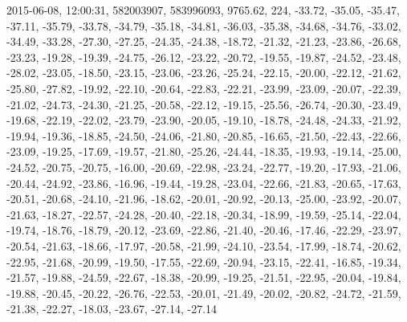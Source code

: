 2015-06-08, 12:00:31, 582003907, 583996093, 9765.62, 224, -33.72, -35.05, -35.47, -37.11, -35.79, -33.78, -34.79, -35.18, -34.81, -36.03, -35.38, -34.68, -34.76, -33.02, -34.49, -33.28, -27.30, -27.25, -24.35, -24.38, -18.72, -21.32, -21.23, -23.86, -26.68, -23.23, -19.28, -19.39, -24.75, -26.12, -23.22, -20.72, -19.55, -19.87, -24.52, -23.48, -28.02, -23.05, -18.50, -23.15, -23.06, -23.26, -25.24, -22.15, -20.00, -22.12, -21.62, -25.80, -27.82, -19.92, -22.10, -20.64, -22.83, -22.21, -23.99, -23.09, -20.07, -22.39, -21.02, -24.73, -24.30, -21.25, -20.58, -22.12, -19.15, -25.56, -26.74, -20.30, -23.49, -19.68, -22.19, -22.02, -23.79, -23.90, -20.05, -19.10, -18.78, -24.48, -24.33, -21.92, -19.94, -19.36, -18.85, -24.50, -24.06, -21.80, -20.85, -16.65, -21.50, -22.43, -22.66, -23.09, -19.25, -17.69, -19.57, -21.80, -25.26, -24.44, -18.35, -19.93, -19.14, -25.00, -24.52, -20.75, -20.75, -16.00, -20.69, -22.98, -23.24, -22.77, -19.20, -17.93, -21.06, -20.44, -24.92, -23.86, -16.96, -19.44, -19.28, -23.04, -22.66, -21.83, -20.65, -17.63, -20.51, -20.68, -24.10, -21.96, -18.62, -20.01, -20.92, -20.13, -25.00, -23.92, -20.07, -21.63, -18.27, -22.57, -24.28, -20.40, -22.18, -20.34, -18.99, -19.59, -25.14, -22.04, -19.74, -18.76, -18.79, -20.12, -23.69, -22.86, -21.40, -20.46, -17.46, -22.29, -23.97, -20.54, -21.63, -18.66, -17.97, -20.58, -21.99, -24.10, -23.54, -17.99, -18.74, -20.62, -22.95, -21.68, -20.99, -19.50, -17.55, -22.69, -20.94, -23.15, -22.41, -16.85, -19.34, -21.57, -19.88, -24.59, -22.67, -18.38, -20.99, -19.25, -21.51, -22.95, -20.04, -19.84, -19.88, -20.45, -20.22, -26.76, -22.53, -20.01, -21.49, -20.02, -20.82, -24.72, -21.59, -21.38, -22.27, -18.03, -23.67, -27.14, -27.14
